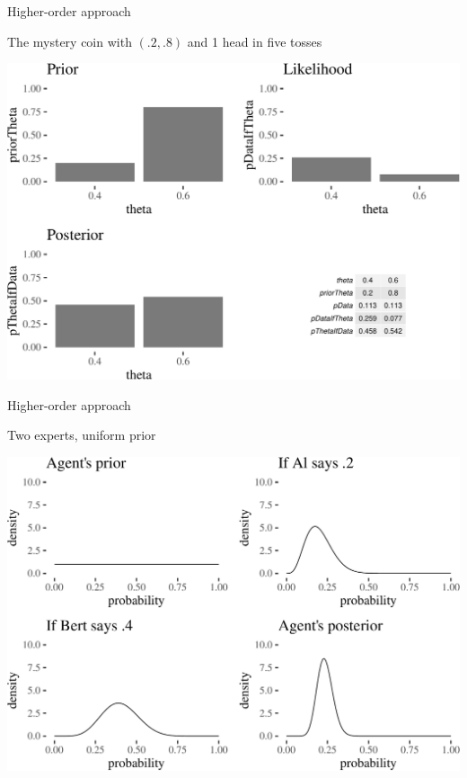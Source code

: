 \documentclass[10pt,ignorenonframetext,x11names, dvipsnames, bibspacing,natbib]{beamer}
\begin{document}
\begin{frame}{Higher-order approach}

\begin{block}{The mystery coin with \((.2,.8)\) and 1 head in five
tosses}

\begin{center}\includegraphics[width=0.9\linewidth]{presentationESSLLI_files/figure-beamer/unnamed-chunk-5-1} \end{center}

\end{block}

\end{frame}

\begin{frame}{Higher-order approach}

\begin{block}{Two experts, uniform prior}

\begin{center}\includegraphics[width=0.9\linewidth]{presentationESSLLI_files/figure-beamer/unnamed-chunk-6-1} \end{center}

\end{block}

\end{frame}
\end{document}
